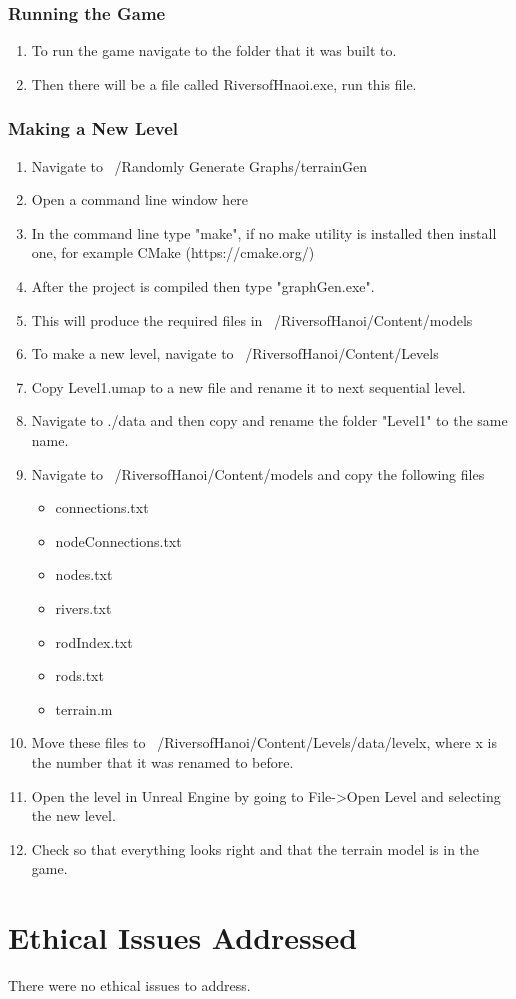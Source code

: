 \begin{appendices}
\subsection{Running the Game}

\begin{enumerate}
	\item To run the game navigate to the folder that it was built to.
	\item Then there will be a file called RiversofHnaoi.exe, run this file.
\end{enumerate}

\subsection{Making a New Level}

\begin{enumerate}
	\item Navigate to ~/Randomly Generate Graphs/terrainGen
	\item Open a command line window here
	\item In the command line type "make", if no make utility is installed then install one, for example CMake (https://cmake.org/)
	\item After the project is compiled then type "graphGen.exe".
	\item This will produce the required files in ~/RiversofHanoi/Content/models
	\item To make a new level, navigate to ~/RiversofHanoi/Content/Levels
	\item Copy Level1.umap to a new file and rename it to next sequential level.
	\item Navigate to ./data and then copy and rename the folder "Level1" to the same name.
	\item Navigate to ~/RiversofHanoi/Content/models and copy the following files
	\begin{itemize}
		\item connections.txt
		\item nodeConnections.txt
		\item nodes.txt
		\item rivers.txt
		\item rodIndex.txt
		\item rods.txt
		\item terrain.m
	\end{itemize}
	\item Move these files to ~/RiversofHanoi/Content/Levels/data/levelx, where x is the number that it was renamed to before.
	\item Open the level in Unreal Engine by going to File->Open Level and selecting the new level.
	\item Check so that everything looks right and that the terrain model is in the game.
\end{enumerate}


\chapter{Ethical Issues Addressed}
There were no ethical issues to address.
\end{appendices}